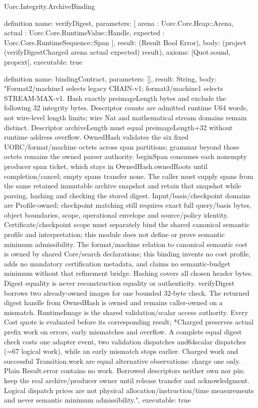 \begin{lexlean}{Uorc.Integrity.ArchiveBinding}
\begin{semanticmodule}
definition{
  name: verifyDigest,
  parameters: [
    arena : Uorc.Core.Heap::Arena,
    actual : Uorc.Core.RuntimeValue::Handle,
    expected : Uorc.Core.RuntimeSequence::Span
  ],
  result: (Result Bool Error),
  body: (project (verifyDigestCharged arena actual expected) result),
  axioms: [Quot.sound, propext],
  executable: true
}

definition{
  name: bindingContract,
  parameters: [],
  result: String,
  body: "Format2/machine1 selects legacy CHAIN-v1; format3/machine1 selects STREAM-MAX-v1. Hash exactly preimageLength bytes and exclude the following 32 integrity bytes. Descriptor counts are admitted runtime U64 words, not wire-level length limits; wire Nat and mathematical stream domains remain distinct. Descriptor archiveLength must equal preimageLength+32 without runtime address overflow. OwnedHash validates the six fixed UORC/format/machine octets across span partitions; grammar beyond those octets remains the owned parser authority. beginSpan consumes each nonempty producer span ticket, which stays in OwnedHash.ownedRoots until completion/cancel; empty spans transfer none. The caller must supply spans from the same retained immutable archive snapshot and retain that snapshot while parsing, hashing and checking the stored digest. Input/basis/checkpoint domains are Profile-owned; checkpoint matching still requires exact full query/basis bytes, object boundaries, scope, operational envelope and source/policy identity. Certificate/checkpoint scope must separately bind the shared canonical semantic profile and interpretation; this module does not define or prove semantic minimum admissibility. The format/machine relation to canonical semantic cost is owned by shared Core/search declarations; this binding invents no cost profile, adds no mandatory certification metadata, and claims no semantic-budget minimum without that refinement bridge. Hashing covers all chosen header bytes. Digest equality is never reconstruction equality or authenticity. verifyDigest borrows two already-owned images for one bounded 32-byte check. The returned digest handle from OwnedHash is owned and remains caller-owned on a mismatch. RuntimeImage is the shared validation/scalar access authority. Every Cost quote is evaluated before its corresponding result; *Charged preserves actual prefix work on errors, early mismatches and overflow. A complete equal digest check costs one adapter event, two validation dispatches and64scalar dispatches (=67 logical work), while an early mismatch stops earlier. Charged work and successful Transition.work are equal alternative observations: charge one only. Plain Result.error contains no work. Borrowed descriptors neither own nor pin: keep the real archive/producer owner until release transfer and acknowledgment. Logical dispatch prices are not physical allocation/instruction/time measurements and never semantic minimum admissibility.",
  executable: true
}
\end{semanticmodule}
\end{lexlean}
